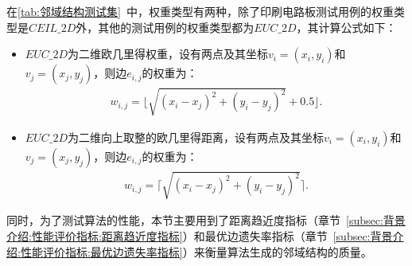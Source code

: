 \par
在\autoref{tab:邻域结构测试集}~中，权重类型\cite{reinelt1995tsplib95}有两种，除了印刷电路板测试用例的权重类型是$CEIL\_2D$外，其他的测试用例的权重类型都为$EUC\_2D$，其计算公式如下：
\begin{itemize}
    \item $EUC\_2D$为二维欧几里得权重，设有两点及其坐标$v_i = (x_i, y_i)$和$v_j = (x_j, y_j)$，则边$e_{i,j}$的权重为：
    \vspace{-1.5em}
    \begin{align}
        \label{eq:EUC_2D}
        w_{i,j} = \lfloor \sqrt{(x_i-x_j)^2 + (y_i-y_j)^2} + 0.5 \rfloor .
    \end{align}
    \vspace{-1.5em}
    \item $EUC\_2D$为二维向上取整的欧几里得距离，设有两点及其坐标$v_i = (x_i, y_i)$和$v_j = (x_j, y_j)$，则边$e_{i,j}$的权重为：
    \vspace{-1.5em}
    \begin{align}
        \label{eq:CEIL_2D}
        w_{i,j} = \lceil \sqrt{(x_i-x_j)^2 + (y_i-y_j)^2} \rceil .
    \end{align}
\end{itemize}
\par
同时，为了测试算法的性能，本节主要用到了距离趋近度指标（章节~\ref{subsec:背景介绍:性能评价指标:距离趋近度指标}）和最优边遗失率指标（章节~\ref{subsec:背景介绍:性能评价指标:最优边遗失率指标}）来衡量算法生成的邻域结构的质量。

